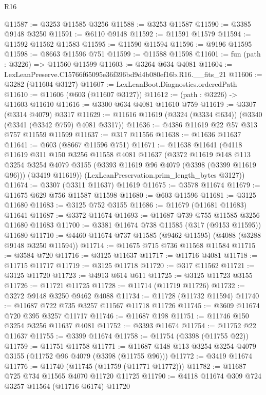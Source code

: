 \begin{lexlean}{R16}
\begin{coremodule}
@11587 := @3253 @11585 @3256
@11588 := @3253 @11587
@11590 := @3385 @9148 @3250
@11591 := @6110 @9148
@11592 := @11591 @11579
@11594 := @11592 @11562 @11583
@11595 := @11590 @11594
@11596 := @9196 @11595
@11598 := @8663 @11596 @751
@11599 := @11588 @11598
@11601 := fun (path : @3226) => @11560 @11599
@11603 := @3264 @634 @4081
@11604 := LexLeanPreserve.C15766f65095e36f396bd9d4b080ef16b.R16.__fits_21
@11606 := @3282 (@11604 @3127)
@11607 := LexLeanBoot.Diagnostics.orderedPath
@11610 := @11606 (@603 (@11607 @3127))
@11612 := (path : @3226) -> @11603 @11610
@11616 := @3300 @634 @4081 @11610 @759
@11619 := @3307 (@3314 @4079) @3317
@11629 := @11616 @11619 (@3324 (@3334 @634)) (@3340 (@3341 (@3342 @759) @4081 @3317))
@11636 := @4386 @11619 @22 @57 @313 @757 @11559 @11599
@11637 := @317 @11556
@11638 := @11636 @11637
@11641 := @603 (@8667 @11596 @751)
@11671 := @11638
    @11641
    (@4118
      @11619
      @311
      @150
      @3256
      @11558
      @4081
      @11637
      (@3372
        @11619
        @148
        @113
        @3254
        @3254
        @4079
        @3155
        (@3393 @11619 @96 @4079 (@3398 (@3399 @11619 @96)))
        (@3419 @11619))
      (LexLeanPreservation.prim_length_bytes @3127))
@11674 := @3307 (@3311 @11637) @11619
@11675 := @3578 @11674
@11679 := @11675 @629 @756 @11587 @11598
@11680 := @603 @11596
@11681 := @3125 @11680
@11683 := @3125 @752 @3155
@11686 := @11679 (@11681 @11683) @11641
@11687 := @3372 @11674
@11693 := @11687 @739 @755 @11585 @3256 @11680 @11683
@11700 := @3381 @11674 @738 @11585 (@317 (@9153 @11595)) @11680
@11710 := @4460 @11674 @737 @11585 (@9462 @11595) (@4088 (@3288 @9148 @3250 @11594))
@11714 := @11675 @715 @736 @11568 @11584
@11715 := @3584 @720
@11716 := @3125 @11637
@11717 := @11716 @4081
@11718 := @11715 @11717
@11719 := @3125 @11718
@11720 := @317 @11562
@11721 := @3125 @11720
@11723 := @4913 @614 @611
@11725 := @3125 @11723 @3155
@11726 := @11721 @11725
@11728 := @11714 (@11719 @11726)
@11732 := @3272 @9148 @3250 @9462 @4088
@11734 := @11728 (@11732 @11594)
@11740 := @11687 @722 @735 @3257 @11567 @11718 @11726
@11745 := @3609 @11674 @720 @395 @3257 @11717
@11746 := @11687 @198
@11751 := @11746 @150 @3254 @3256 @11637 @4081
@11752 := @3393 @11674
@11754 := @11752 @22 @11637
@11755 := @3399 @11674
@11758 := @11754 (@3398 (@11755 @22))
@11759 := @11751 @11758
@11771 := @11687 @148 @113 @3254 @3254 @4079 @3155 (@11752 @96 @4079 (@3398 (@11755 @96)))
@11772 := @3419 @11674
@11776 := @11740 (@11745 (@11759 (@11771 @11772)))
@11782 := @11687 @725 @734 @11565 @4070 @11720 @11725
@11790 := @4118 @11674 @309 @724 @3257 @11564 (@11716 @6174) @11720

\end{coremodule}
\end{lexlean}
